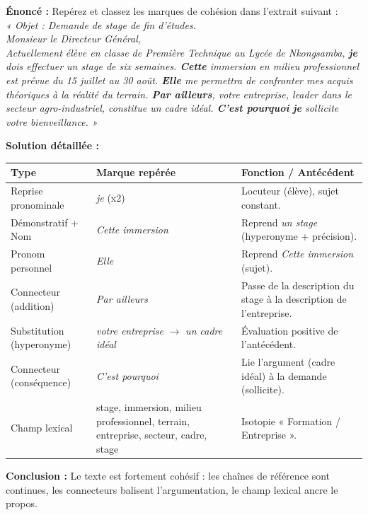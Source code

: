 \documentclass[11pt]{article}
\begin{document}
\begin{exoresolu}
\textbf{Énoncé :} Repérez et classez les marques de cohésion dans l'extrait suivant :\\
\emph{« Objet : Demande de stage de fin d'études.\\
Monsieur le Directeur Général,\\
Actuellement élève en classe de Première Technique au Lycée de Nkongsamba, \textbf{je} dois effectuer un stage de six semaines. \textbf{Cette} immersion en milieu professionnel est prévue du 15 juillet au 30 août. \textbf{Elle} me permettra de confronter mes acquis théoriques à la réalité du terrain. \textbf{Par ailleurs}, votre entreprise, leader dans le secteur agro-industriel, constitue un cadre idéal. \textbf{C'est pourquoi} \textbf{je} sollicite votre bienveillance. »}

\textbf{Solution détaillée :}
\begin{center}
\begin{tabularx}{\linewidth}{|l|X|X|}\hline
\textbf{Type} & \textbf{Marque repérée} & \textbf{Fonction / Antécédent} \\ \hline
Reprise pronominale & \emph{je} (x2) & Locuteur (élève), sujet constant. \\ \hline
Démonstratif + Nom & \emph{Cette immersion} & Reprend \emph{un stage} (hyperonyme + précision). \\ \hline
Pronom personnel & \emph{Elle} & Reprend \emph{Cette immersion} (sujet). \\ \hline
Connecteur (addition) & \emph{Par ailleurs} & Passe de la description du stage à la description de l'entreprise. \\ \hline
Substitution (hyperonyme) & \emph{votre entreprise} $\rightarrow$ \emph{un cadre idéal} & Évaluation positive de l'antécédent. \\ \hline
Connecteur (conséquence) & \emph{C'est pourquoi} & Lie l'argument (cadre idéal) à la demande (sollicite). \\ \hline
Champ lexical & stage, immersion, milieu professionnel, terrain, entreprise, secteur, cadre, stage & Isotopie « Formation / Entreprise ». \\ \hline
\end{tabularx}
\end{center}
\textbf{Conclusion :} Le texte est fortement cohésif : les chaînes de référence sont continues, les connecteurs balisent l'argumentation, le champ lexical ancre le propos.
\end{exoresolu}
\end{document}
